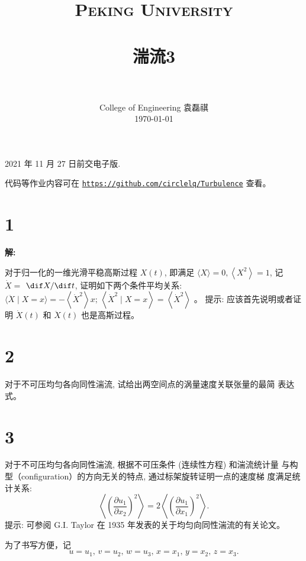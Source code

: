 \documentclass[12pt,a4]{ctexart}
\title{
   \vspace{-1in}
   \usefont{OT1}{bch}{b}{n}
   \normalfont \normalsize \textsc{\LARGE Peking University}\\[1cm] %
   \horrule{0.5pt} \\[0.5cm]
   \huge \bfseries{湍流3} \\
   \horrule{2pt} \\[0.5cm]
}
\author{
   \normalfont									\normalsize
   College of Engineering \quad 2001111690  \quad 袁磊祺\\	\normalsize
   \today
}
\date{}
\begin{document}


\maketitle

2021 年 11 月 27 日前交电子版.

代码等作业内容可在 \texttt{\href{https://github.com/circlelq/Turbulence}{https://github.com/circlelq/Turbulence}} 查看。


\section{1}

\textsf{\hspace{-2em}\sf  \textbf{解:}}

对于归一化的一维光滑平稳高斯过程 $X(t)$, 即满足 $\langle X\rangle=0,\left\langle X^{2}\right\rangle=1$, 记 $\dot{X}=$ $\dif X / \dif t$, 证明如下两个条件平均关系: $\langle\ddot{X} \mid X=x\rangle=-\left\langle\dot{X}^{2}\right\rangle x ;\, \left\langle\dot{X}^{2} \mid X=x\right\rangle=\left\langle\dot{X}^{2}\right\rangle$ 。 提示: 应该首先说明或者证明 $\dot{X}(t)$ 和 $\ddot{X}(t)$ 也是高斯过程。

\section{2}
对于不可压均匀各向同性湍流, 试给出两空间点的涡量速度关联张量的最简 表达式。


\section{3}
对于不可压均匀各向同性湍流, 根据不可压条件 (连续性方程) 和湍流统计量 与构型（configuration）的方向无关的特点, 通过标架旋转证明一点的速度梯 度满足统计关系:
\begin{equation}
   \left\langle\left(\frac{\partial u_{1}}{\partial x_{2}}\right)^{2}\right\rangle=2\left\langle\left(\frac{\partial u_{1}}{\partial x_{1}}\right)^{2}\right\rangle.
\end{equation}
提示: 可参阅 G.I. Taylor 在 1935 年发表的关于均匀向同性湍流的有关论文。


为了书写方便，记
\begin{equation}
   u = u_1,\, v = u_2,\, w = u_3,\, x = x_1,\, y = x_2,\, z = x_3.
\end{equation}
\end{document}
